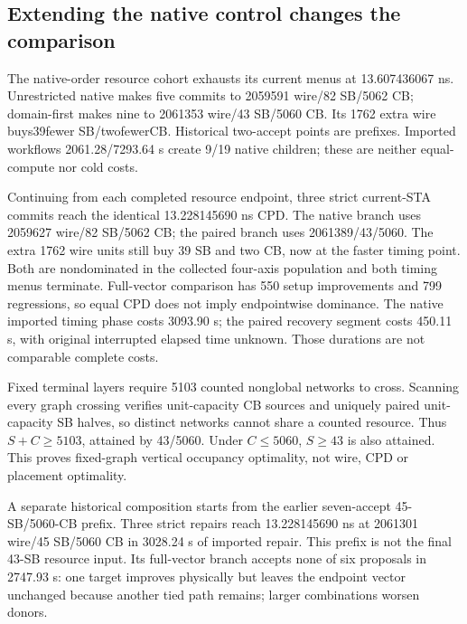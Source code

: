 \documentclass[conference,10pt]{IEEEtran}
\begin{document}
\subsection{Extending the native control changes the comparison}
The native-order resource cohort exhausts its current menus at 13.607436067 ns. Unrestricted native makes five commits to 2059591 wire/82 SB/5062 CB; domain-first makes nine to 2061353 wire/43 SB/5060 CB. Its 1762 extra wire buys39fewer SB/twofewerCB. Historical two-accept points are prefixes. Imported workflows 2061.28/7293.64 s create 9/19 native children; these are neither equal-compute nor cold costs.

Continuing from each completed resource endpoint, three strict current-STA commits reach the identical 13.228145690 ns CPD. The native branch uses 2059627 wire/82 SB/5062 CB; the paired branch uses 2061389/43/5060. The extra 1762 wire units still buy 39 SB and two CB, now at the faster timing point. Both are nondominated in the collected four-axis population and both timing menus terminate. Full-vector comparison has 550 setup improvements and 799 regressions, so equal CPD does not imply endpointwise dominance. The native imported timing phase costs 3093.90 s; the paired recovery segment costs 450.11 s, with original interrupted elapsed time unknown. Those durations are not comparable complete costs.

Fixed terminal layers require 5103 counted nonglobal networks to cross. Scanning every graph crossing verifies unit-capacity CB sources and uniquely paired unit-capacity SB halves, so distinct networks cannot share a counted resource. Thus $S+C\ge5103$, attained by 43/5060. Under $C\le5060$, $S\ge43$ is also attained. This proves fixed-graph vertical occupancy optimality, not wire, CPD or placement optimality.

A separate historical composition starts from the earlier seven-accept 45-SB/5060-CB prefix. Three strict repairs reach 13.228145690 ns at 2061301 wire/45 SB/5060 CB in 3028.24 s of imported repair. This prefix is not the final 43-SB resource input. Its full-vector branch accepts none of six proposals in 2747.93 s: one target improves physically but leaves the endpoint vector unchanged because another tied path remains; larger combinations worsen donors.
\end{document}
